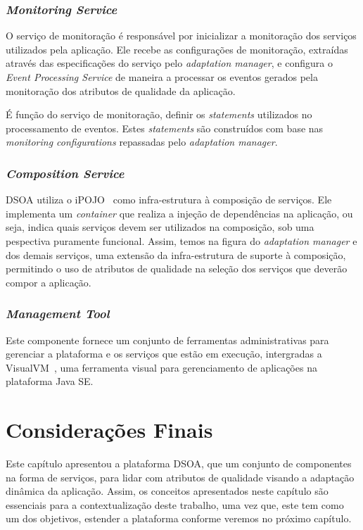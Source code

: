\subsubsection{\textit{Monitoring Service}}
\label{subsec:monit_serv}
O serviço de monitoração é responsável por inicializar a monitoração dos serviços utilizados pela aplicação. Ele recebe as configurações de monitoração, extraídas através das especificações do serviço pelo \textit{adaptation manager}, e configura o \textit{Event Processing Service} de maneira a processar os eventos gerados pela monitoração dos atributos de qualidade da aplicação.

É função do serviço de monitoração, definir os \textit{statements} utilizados no processamento de eventos. Estes \textit{statements} são construídos com base nas \textit{monitoring configurations} repassadas pelo \textit{adaptation manager}.

\subsubsection{\textit{Composition Service}}
DSOA utiliza o iPOJO~\cite{ipojo} como infra-estrutura à composição de serviços. Ele implementa um \textit{container} que realiza a injeção de dependências na aplicação, ou seja, indica quais serviços devem ser utilizados na composição, sob uma pespectiva puramente funcional. Assim, temos na figura do \textit{adaptation manager} e dos demais serviços, uma extensão da infra-estrutura de suporte à composição, permitindo o uso de atributos de qualidade na seleção dos serviços que deverão compor a aplicação.

\subsubsection{\textit{Management Tool}}
Este componente fornece um conjunto de ferramentas administrativas para gerenciar a plataforma e os serviços que estão em execução, intergradas a VisualVM~\cite{visualvm}, uma ferramenta visual para gerenciamento de aplicações na plataforma Java SE.

\section{Considerações Finais}
Este capítulo apresentou a plataforma DSOA, que um conjunto de componentes na forma de serviços, para lidar com atributos de qualidade visando a adaptação dinâmica da aplicação. Assim, os conceitos apresentados neste capítulo são essenciais para a contextualização deste trabalho, uma vez que, este tem como um dos objetivos, estender a plataforma conforme veremos no próximo capítulo.